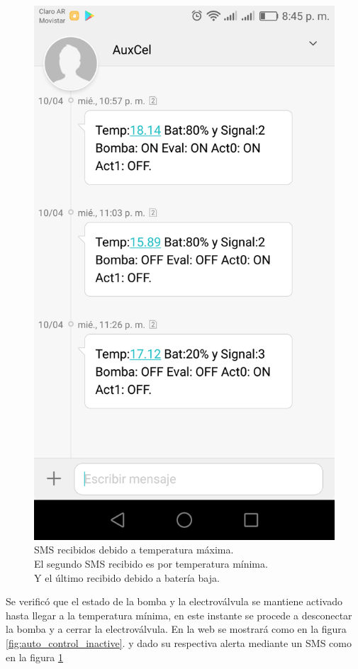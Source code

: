 \begin{figure}[h]
  \centering
  \includegraphics[scale=.15]{./Figures/sms_min_max_bat.png}
  \caption{SMS recibidos debido a temperatura máxima. \\
   El segundo SMS recibido es por temperatura mínima. \\
   Y el último recibido debido a batería baja.}
  \label{fig:sms_min_max_bat}
\end{figure}

Se verificó que el estado de la bomba y la electroválvula se mantiene activado hasta llegar a la temperatura mínima, en este instante se procede a desconectar la bomba y a cerrar la electroválvula. En la web se mostrará  como en la figura \ref{fig:auto_control_inactive}. y dado su respectiva alerta mediante un SMS como en la figura \ref{fig:sms_min_max_bat}

